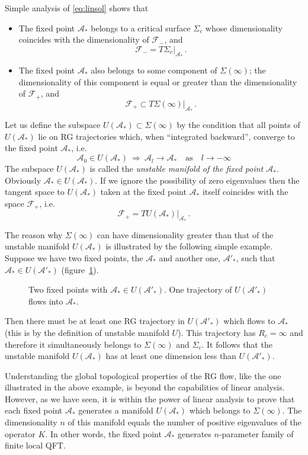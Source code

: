 Simple analysis of \eqref{eq:linsol} shows that
\begin{itemize}
\item The fixed point $\mathcal A_*$ belongs to a critical surface $\Sigma_c$ whose
dimensionality coincides with the dimensionality of $\mathcal F_-$, and
\[
\mathcal F_-=T\Sigma_c|_{\mathcal A_*}\,.
\]
\item The fixed point $\mathcal A_*$ also belongs to some component of
$\Sigma(\infty)$; the dimensionality of this component is equal or greater than
the dimensionality of $\mathcal F_+$, and
\[
\mathcal F_+\subset T\Sigma(\infty)|_{\mathcal A_*}\,.
\]
\end{itemize}

Let us define the subspace $U(\mathcal A_*)\subset\Sigma(\infty)$ by the condition
that all points of $U(\mathcal A_*)$ lie on RG trajectories which, when
``integrated backward'', converge to the fixed point $\mathcal A_*$, i.e.
\[
\mathcal A_0\in U(\mathcal A_*)\ \Rightarrow\ \mathcal A_l\to\mathcal A_*\quad\text{as}\quad l\to-\infty
\]
The subspace $U(\mathcal A_*)$ is called the \emph{unstable manifold of the fixed
point $\mathcal A_*$}. Obviously $\mathcal A_*\in U(\mathcal A_*)$. If we ignore
the possibility of zero eigenvalues then the tangent space to $U(\mathcal A_*)$
taken at the fixed point $\mathcal A_*$ itself coincides with the space
$\mathcal F_+$, i.e.
\[
\mathcal F_+=TU(\mathcal A_*)|_{\mathcal A_*}\,.
\]

The reason why $\Sigma(\infty)$ can have dimensionality greater than that of the
unstable manifold $U(\mathcal A_*)$ is illustrated by the following simple
example. Suppose we have two fixed points, the $\mathcal A_*$ and another one,
$\mathcal A'_*$, such that $\mathcal A_*\in U(\mathcal A'_*)$
(figure~\ref{fig:twofp}).
\begin{figure}[ht]
\centering{}
\caption{Two fixed points with $\mathcal A_*\in U(\mathcal A'_*)$. One
trajectory of $U(\mathcal A'_*)$ flows into $\mathcal A_*$.}
\label{fig:twofp}
\end{figure}
Then there must be at least one RG trajectory in $U(\mathcal A'_*)$ which flows to
$\mathcal A_*$ (this is by the definition of unstable manifold $U$). This
trajectory has $R_c=\infty$ and therefore it simultaneously belongs to
$\Sigma(\infty)$ and $\Sigma_c$. It follows that the unstable manifold
$U(\mathcal A_*)$ has at least one dimension less than $U(\mathcal A'_*)$.

Understanding the global topological properties of the RG flow, like the one
illustrated in the above example, is beyond the capabilities of linear analysis.
However, as we have seen, it is within the power of linear analysis to prove that
each fixed point $\mathcal A_*$ generates a manifold $U(\mathcal A_*)$ which
belongs to $\Sigma(\infty)$. The dimensionality $n$ of this manifold equals the
number of positive eigenvalues of the operator $K$. In other words, the fixed
point $\mathcal A_*$ generates $n$-parameter family of finite local QFT.

